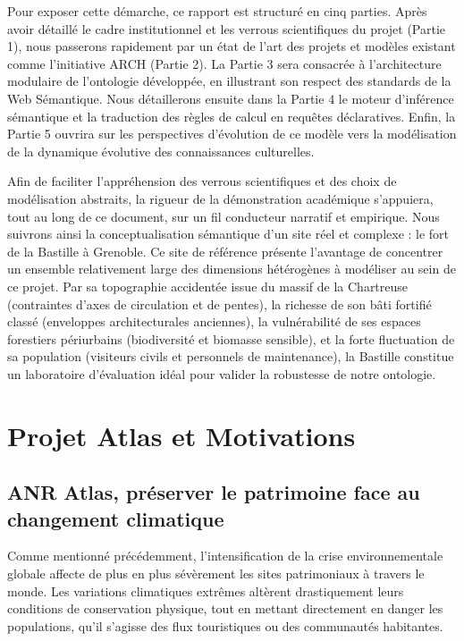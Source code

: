 \documentclass{article}
\begin{document}
Pour exposer cette démarche, ce rapport est structuré en cinq parties. Après avoir détaillé le cadre institutionnel et les verrous scientifiques du projet (Partie 1), nous passerons rapidement par un état de l'art des projets et modèles existant comme l'initiative ARCH (Partie 2). La Partie 3 sera consacrée à l'architecture modulaire de l'ontologie développée, en illustrant son respect des standards de la Web Sémantique. Nous détaillerons ensuite dans la Partie 4 le moteur d'inférence sémantique et la traduction des règles de calcul en requêtes déclaratives. Enfin, la Partie 5 ouvrira sur les perspectives d'évolution de ce modèle vers la modélisation de la dynamique évolutive des connaissances culturelles.

Afin de faciliter l'appréhension des verrous scientifiques et des choix de modélisation abstraits, la rigueur de la démonstration académique s'appuiera, tout au long de ce document, sur un fil conducteur narratif et empirique. Nous suivrons ainsi la conceptualisation sémantique d'un site réel et complexe : le fort de la Bastille à Grenoble. Ce site de référence présente l'avantage de concentrer un ensemble relativement large des dimensions hétérogènes à modéliser au sein de ce projet. Par sa topographie accidentée issue du massif de la Chartreuse (contraintes d'axes de circulation et de pentes), la richesse de son bâti fortifié classé (enveloppes architecturales anciennes), la vulnérabilité de ses espaces forestiers périurbains (biodiversité et biomasse sensible), et la forte fluctuation de sa population (visiteurs civils et personnels de maintenance), la Bastille constitue un laboratoire d'évaluation idéal pour valider la robustesse de notre ontologie.
\clearpage
\section{Projet Atlas et Motivations}

\subsection{ANR Atlas, préserver le patrimoine face au changement climatique}

Comme mentionné précédemment, l'intensification de la crise environnementale globale affecte de plus en plus sévèrement les sites patrimoniaux à travers le monde. Les variations climatiques extrêmes altèrent drastiquement leurs conditions de conservation physique, tout en mettant directement en danger les populations, qu'il s'agisse des flux touristiques ou des communautés habitantes. 
\end{document}
